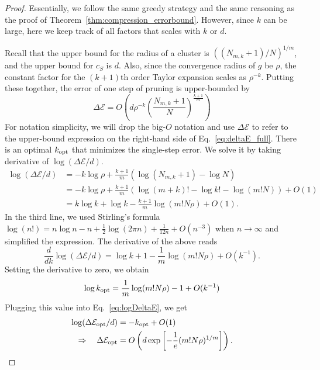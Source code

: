 \documentclass{article}
\theoremstyle{plain}
\begin{document}
\begin{proof}

Essentially, we follow the same greedy strategy and the same reasoning as the proof of Theorem~\ref{thm:compression_errorbound}. However, since $k$ can be large, here we keep track of all factors that scales with $k$ or $d$. 

Recall that the upper bound for the radius of a cluster is $((N_{m,k}+1)/N)^{1/m}$, and the upper bound for $c_S$ is $d$. Also, since the convergence radius of $g$ be $\rho$, the constant factor for the $(k+1)$th order Taylor expansion scales as $\rho^{-k}$. Putting these together, the error of one step of pruning is upper-bounded by
\begin{equation}    \label{eq:deltaE_full}
    \Delta \mathcal{E} = O\left( d \rho^{-k} \left( \frac{N_{m,k}+1}{N} \right)^{\frac{k+1}{m}} \right)
\end{equation}
For notation simplicity, we will drop the big-$O$ notation and use $\Delta\mathcal{E}$ to refer to the upper-bound expression on the right-hand side of Eq.~\eqref{eq:deltaE_full}. There is an optimal $k_{\rm opt}$ that minimizes the single-step error. We solve it by taking derivative of $\log (\Delta\mathcal{E}/d)$. 
\begin{equation}    \label{eq:logDeltaE}
    \begin{aligned}
        \log(\Delta\mathcal{E}/d)
        &= -k\log\rho + \frac{k+1}{m} \left( \log (N_{m,k}+1) - \log N \right)\\
        &= -k\log\rho + \frac{k+1}{m} \left( \log(m+k)! - \log k! - \log(m!N) \right) + O(1)   \\
        &= k\log k + \log k - \frac{k+1}{m}\log(m!N\rho) + O(1)   .
    \end{aligned}
\end{equation}
In the third line, we used Stirling's formula $\log(n!) = n\log n - n + \frac{1}{2}\log (2\pi n) + \frac{1}{12n} + O(n^{-3})$ when $n\to\infty$ and simplified the expression. The derivative of the above reads
\begin{equation}
    \frac{d}{dk} \log(\Delta\mathcal{E}/d)
    = \log k+1-\frac{1}{m}\log(m!N\rho) + O(k^{-1}) .
\end{equation}
Setting the derivative to zero, we obtain
\begin{equation}
        \log k_{\rm opt} = \frac{1}{m} \log (m! N \rho) -1 + O(k^{-1})
\end{equation}
Plugging this value into Eq.~\eqref{eq:logDeltaE}, we get
\begin{equation}
    \begin{aligned}
        \log(\Delta\mathcal{E}_{\mathrm{opt}}/d) &= -k_{\mathrm{opt}} + O(1)    \\
        \Rightarrow\quad
        \Delta \mathcal{E}_{\rm opt} &= O\left( d \exp\left[ -\frac{1}{e} (m!N\rho)^{1/m} \right] \right) .
    \end{aligned}
\end{equation}


\end{proof}
\end{document}
